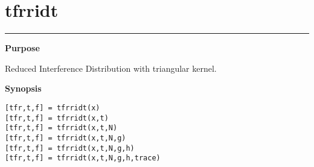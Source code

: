 

\section*{\hspace*{-1.6cm} tfrridt}

\vspace*{-.4cm}
\hspace*{-1.6cm}\rule[0in]{16.5cm}{.02cm}
\vspace*{.2cm}

{\bf \large \sf Purpose}\\
\hspace*{1.5cm}
\begin{minipage}[t]{13.5cm}
Reduced Interference Distribution with triangular kernel.
\end{minipage}
\vspace*{.5cm}

{\bf \large \sf Synopsis}\\
\hspace*{1.5cm}
\begin{minipage}[t]{13.5cm}
\begin{verbatim}
[tfr,t,f] = tfrridt(x)
[tfr,t,f] = tfrridt(x,t)
[tfr,t,f] = tfrridt(x,t,N)
[tfr,t,f] = tfrridt(x,t,N,g)
[tfr,t,f] = tfrridt(x,t,N,g,h)
[tfr,t,f] = tfrridt(x,t,N,g,h,trace)
\end{verbatim}
\end{minipage}
\vspace*{.5cm}


